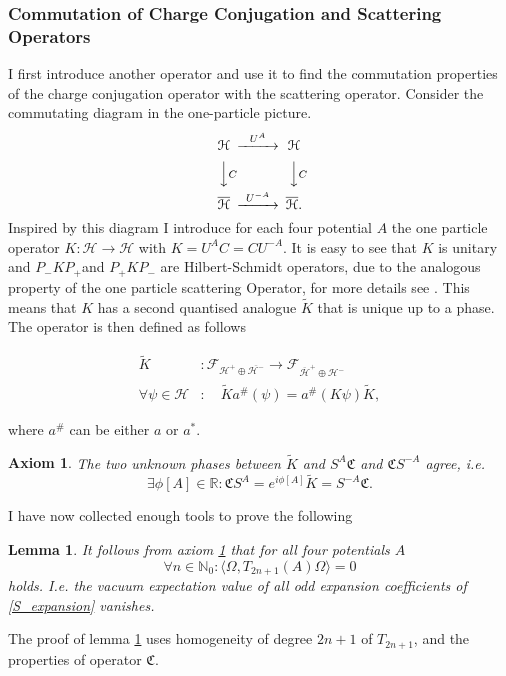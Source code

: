 \documentclass[b5paper,draft,openbib,12pt]{memoir}
\newtheorem{axiom}{Axiom}
\newtheorem{lemma}{Lemma}
\begin{document}
\subsubsection{Commutation of Charge Conjugation and Scattering Operators}
I first introduce another operator and use it to find the commutation properties of the charge conjugation operator with the scattering operator. Consider the commutating diagram in the one-particle picture.
\begin{equation}
\begin{CD}							
 \mathcal{H}     @>U^A>>  \mathcal{H}\\
@VVCV        @VVCV\\
\overline{\mathcal{H}}    @>U^{-A}>> \overline{ \mathcal{H}} .
\end{CD}
\end{equation}
Inspired by this diagram I introduce for each four potential \(A\) the one particle operator \(K: \mathcal{H}\rightarrow\mathcal{H}\) with \(K=U^AC=C U^{-A}\). It is easy to see that \(K\) is unitary and \( P_- K P_+\)and \( P_+ K P_-\) are Hilbert-Schmidt operators, due to the analogous property of the one particle scattering Operator, for more details see \cite{deckert2010time}. This means that \(K\) has a second quantised analogue \(\tilde{K}\) that is unique up to a phase. The operator is then defined as follows


\begin{align}
\tilde{K} &: \mathcal{F}_{\mathcal{H}^{+}\oplus \overline{\mathcal{H}^{-}}} \rightarrow  \mathcal{F}_{\overline{\mathcal{H}}^{+}\oplus \mathcal{H}^{-}}\\
\forall \psi \in \mathcal{H}&: \quad \tilde{K}a^{\#}(\psi)=a^{\#}(K\psi)\tilde{K},
\end{align}

where \(a^{\#}\) can be either \(a\) or \(a^*\).

\begin{axiom}\label{SC_CS} The two unknown phases between \(\tilde{K}\) and \(S^A \mathfrak{C}\) and \(\mathfrak{C}S^{-A}\) agree, i.e.
\begin{equation}
    \exists \phi[A]\in\mathbb R:  \mathfrak{C}S^A=e^{i\phi[A]} \tilde{K}=S^{-A} \mathfrak{C}.
\end{equation}
\end{axiom}
I have now collected enough tools to prove the following
\begin{lemma}\label{vacuum_expectation_odd}
It follows from axiom \ref{SC_CS} that for all four potentials \(A\)
\begin{equation}
\forall n\in\mathbb{N}_0: \langle \Omega, T_{2n+1}(A) \Omega \rangle=0
\end{equation}
holds. I.e. the vacuum expectation value of all odd expansion coefficients of \eqref{S_expansion} vanishes.
\end{lemma}
The proof of lemma \ref{vacuum_expectation_odd} uses homogeneity of degree
\(2n+1\) of \(T_{2n+1}\), and the properties of operator \(\mathfrak{C}\).
\end{document}
